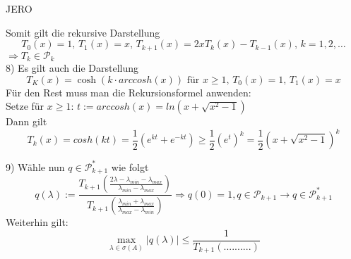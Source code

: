 JERO

Somit gilt die rekursive Darstellung
\[ T_0(x)=1,\, T_1(x)=x,\, T_{k+1}(x)=2xT_k (x) - T_{k-1}(x),\, k=1,2,\dots \]
$ \Rightarrow T_k \in \mathcal{P}_k$ \\
8) Es gilt auch die Darstellung
\[ T_K (x) =\cosh (k\cdot arccosh (x))\text{ für } x \geq 1,\, T_0(x)=1,\, T_1(x)=x \]
Für den Rest muss man die Rekursionsformel anwenden:\\
Setze für $x \geq 1$: $t:=arccosh(x) = ln (x+\sqrt{x^2-1})$\\
Dann gilt
\[ T_k(x) = cosh (kt) = \frac{1}{2} (e^{kt} + e^{-kt})\geq \frac{1}{2} (e^t)^k = \frac{1}{2} (x+\sqrt{x^2-1})^k \]

9) Wähle nun $q \in \mathcal{P}^*_{k+1}$ wie folgt
\[ q(\lambda) := \frac{T_{k+1}\left( \frac{2\lambda - \lambda_{min} - \lambda_{max}}{\lambda_{min}-\lambda_{max}} \right) }{T_{k+1} \left( \frac{\lambda_{min}+\lambda_{max}}{\lambda_{max} - \lambda_{min}}\right)} \Rightarrow q(0)=1, q\in\mathcal{P}_{k+1} \rightarrow q\in\mathcal{P}^*_{k+1} 
\]
Weiterhin gilt: 
\[\max_{\lambda \in \sigma (A)} |q(\lambda)| \leq \frac{1}{T_{k+1}\left( .......... \right)} \]





